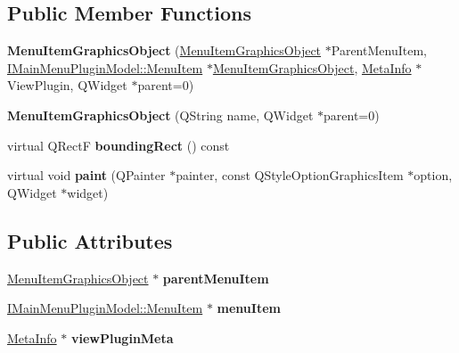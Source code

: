\subsection*{Public Member Functions}
\begin{DoxyCompactItemize}
\item 
{\bfseries Menu\+Item\+Graphics\+Object} (\hyperlink{class_menu_item_graphics_object}{Menu\+Item\+Graphics\+Object} $\ast$Parent\+Menu\+Item, \hyperlink{struct_i_main_menu_plugin_model_1_1_menu_item}{I\+Main\+Menu\+Plugin\+Model\+::\+Menu\+Item} $\ast$\hyperlink{class_menu_item_graphics_object}{Menu\+Item\+Graphics\+Object}, \hyperlink{struct_meta_info}{Meta\+Info} $\ast$View\+Plugin, Q\+Widget $\ast$parent=0)\hypertarget{class_menu_item_graphics_object_a4ebc6be4ca5c88adcf7931e62161d5f1}{}\label{class_menu_item_graphics_object_a4ebc6be4ca5c88adcf7931e62161d5f1}

\item 
{\bfseries Menu\+Item\+Graphics\+Object} (Q\+String name, Q\+Widget $\ast$parent=0)\hypertarget{class_menu_item_graphics_object_a4fabd069df87e7d05c94cd9027aa345b}{}\label{class_menu_item_graphics_object_a4fabd069df87e7d05c94cd9027aa345b}

\item 
virtual Q\+RectF {\bfseries bounding\+Rect} () const \hypertarget{class_menu_item_graphics_object_ad1dd241931d6edb81910a7d5306e8cdd}{}\label{class_menu_item_graphics_object_ad1dd241931d6edb81910a7d5306e8cdd}

\item 
virtual void {\bfseries paint} (Q\+Painter $\ast$painter, const Q\+Style\+Option\+Graphics\+Item $\ast$option, Q\+Widget $\ast$widget)\hypertarget{class_menu_item_graphics_object_a00a392d4eeba783e2e8f73211adf8732}{}\label{class_menu_item_graphics_object_a00a392d4eeba783e2e8f73211adf8732}

\end{DoxyCompactItemize}
\subsection*{Public Attributes}
\begin{DoxyCompactItemize}
\item 
\hyperlink{class_menu_item_graphics_object}{Menu\+Item\+Graphics\+Object} $\ast$ {\bfseries parent\+Menu\+Item}\hypertarget{class_menu_item_graphics_object_a94290bfb4d0a10a7adb0516c84239b53}{}\label{class_menu_item_graphics_object_a94290bfb4d0a10a7adb0516c84239b53}

\item 
\hyperlink{struct_i_main_menu_plugin_model_1_1_menu_item}{I\+Main\+Menu\+Plugin\+Model\+::\+Menu\+Item} $\ast$ {\bfseries menu\+Item}\hypertarget{class_menu_item_graphics_object_a059d772c31b4c5113290a2198150f8d6}{}\label{class_menu_item_graphics_object_a059d772c31b4c5113290a2198150f8d6}

\item 
\hyperlink{struct_meta_info}{Meta\+Info} $\ast$ {\bfseries view\+Plugin\+Meta}\hypertarget{class_menu_item_graphics_object_a8d9594a1c25a956d3e34cab975dde29a}{}\label{class_menu_item_graphics_object_a8d9594a1c25a956d3e34cab975dde29a}

\end{DoxyCompactItemize}
